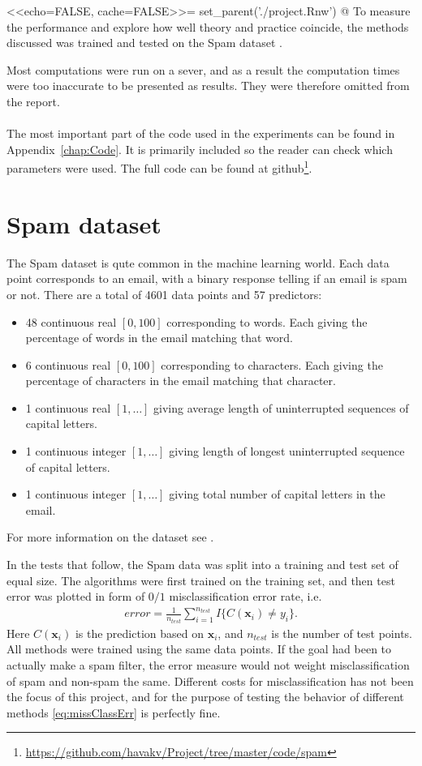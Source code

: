 <<echo=FALSE, cache=FALSE>>=
set_parent('./project.Rnw')
@
%
To measure the performance and explore how well theory and practice coincide, the methods discussed was trained and tested on the Spam dataset \citep{Spamdata}. 

Most computations were run on a sever, and as a result the computation times were too inaccurate to be presented as results. They were therefore omitted from the report.
\\
\\
The most important part of the code used in the experiments can be found in Appendix~\ref{chap:Code}. It is primarily included so the reader can check which parameters were used. The full code can be found at github\footnote{\url{https://github.com/havakv/Project/tree/master/code/spam}}.


\section{Spam dataset}
\label{sec:Spam dataset}
 The Spam dataset is qute common in the machine learning world. 
 Each data point corresponds to an email, with a binary response telling if an email is spam or not. There are a total of 4601 data points and 57 predictors:
 \begin{itemize}
   \item 48 continuous real $[0, 100]$ corresponding to words. Each giving the percentage of words in the email matching that word. 
   \item 6 continuous real $[0, 100]$ corresponding to characters. Each giving the percentage of characters in the email matching that character.
   \item 1 continuous real $[1, \ldots]$ giving average length of uninterrupted sequences of capital letters. 
   \item 1 continuous integer $[1, \ldots]$ giving length of longest uninterrupted sequence of capital letters.
   \item 1 continuous integer $[1, \ldots]$ giving total number of capital letters in the email.
 \end{itemize}
 For more information on the dataset see \cite{Spamdata}.

 In the tests that follow, the Spam data was split into a training and test set of equal size. The algorithms were first trained on the training set, and then test error was plotted in form of $0/1$ misclassification error rate, i.e.
 \begin{align}
   \label{eq:missClassErr} 
   error =  \frac{1}{n_{test}} \sum_{i = 1}^{n_{test}} I\{C(\mathbf{x}_i) \neq y_i\}.
 \end{align}
 Here $C(\mathbf{x}_i)$ is the prediction based on $\mathbf{x}_i$, and $n_{test}$ is the number of test points. 
All methods were trained using the same data points. 
If the goal had been to actually make a spam filter, the error measure would not weight misclassification of spam and non-spam the same. Different costs for misclassification has not been the focus of this project, and for the purpose of testing the behavior of different methods \eqref{eq:missClassErr} is perfectly fine.


